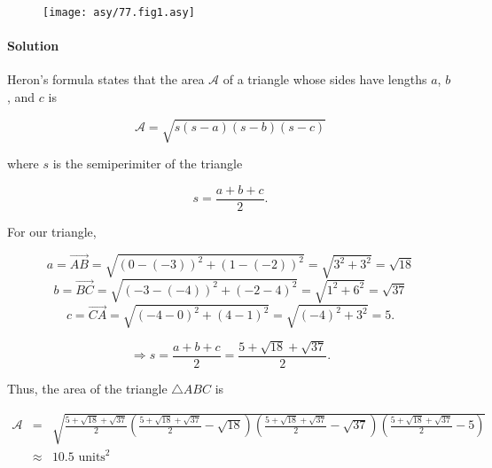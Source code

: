 
\begin{figure}\caption{}\label{77.fig1}\begin{center}\texttt{[image: asy/77.fig1.asy]}\end{center}\end{figure}


\paragraph{Solution} Heron's formula states that the area $\mathcal{A}$ of a triangle whose sides have lengths $a$, $b$, and $c$ is

\[\mathcal{A}=\sqrt{s\left(s-a\right)\left(s-b\right)\left(s-c\right)}\]

where $s$ is the semiperimiter of the triangle

\[s=\frac{a+b+c}{2}.\]

For our triangle,

\[a=\overrightarrow{AB}=\sqrt{\left(0-\left(-3\right)\right)^2+\left(1-\left(-2\right)\right)^2}=\sqrt{3^2+3^2}=\sqrt{18}\]
\[b=\overrightarrow{BC}=\sqrt{\left(-3-\left(-4\right)\right)^2+\left(-2-4\right)^2}=\sqrt{1^2+6^2}=\sqrt{37}\]
\[c=\overrightarrow{CA}=\sqrt{\left(-4-0\right)^2+\left(4-1\right)^2}=\sqrt{\left(-4\right)^2+3^2}=5.\]


\[\Rightarrow s=\frac{a+b+c}{2}=\frac{5+\sqrt{18}+\sqrt{37}}{2}.\]

Thus, the area of the triangle $\triangle ABC$ is

\begin{eqnarray*}
    \mathcal{A}&=&\sqrt{\frac{5+\sqrt{18}+\sqrt{37}}{2}\left(\frac{5+\sqrt{18}+\sqrt{37}}{2}-\sqrt{18}\right)\left(\frac{5+\sqrt{18}+\sqrt{37}}{2}-\sqrt{37}\right)\left(\frac{5+\sqrt{18}+\sqrt{37}}{2}-5\right)}\\
    &\approx&10.5\mbox{ units}^2
\end{eqnarray*}
